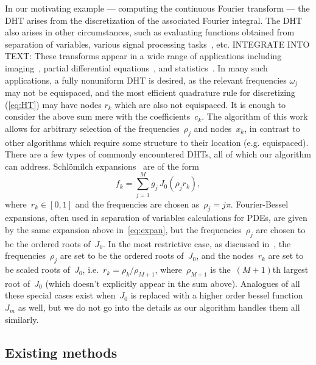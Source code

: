 In our motivating example --- computing the continuous Fourier transform --- the
DHT arises from the discretization of the associated Fourier integral. The DHT
also arises in other circumstances, such as evaluating functions obtained from
separation of variables, various signal processing tasks~\cite{},
etc.{\color{red} INTEGRATE INTO TEXT: These transforms appear in a wide range of
applications including imaging~\cite{higgins1988hankel, zhao2013fourier},
partial differential equations~\cite{bisseling1985fast,ali1999generalized}, and
statistics~\cite{lord1954a, genton2002nonparametric}. In many such applications,
a fully nonuniform DHT is desired, as the relevant frequencies $\omega_j$ may
not be equispaced, and the most efficient quadrature rule for discretizing
(\ref{eq:HT}) may have nodes $r_k$ which are also not equispaced. } It is enough
to consider the above sum mere with the coefficients~$c_k$. The algorithm of
this work allows for arbitrary selection of the frequencies~$\rho_j$ and
nodes~$x_k$, in contrast to other algorithms which require some structure to
their location (e.g. equispaced). There are a few types of commonly encountered
DHTs, all of which our algorithm can address. Schl\"omilch expansions~\cite{}
are of the form
\begin{equation}
  \label{eq:expan}
  f_k = \sum_{j = 1}^M g_j \, J_0(\rho_j r_k),
\end{equation}
where~$r_k \in [0,1]$ and the frequencies are chosen as~$\rho_j = j\pi$.
Fourier-Bessel expansions, often used in separation of variables calculations
for PDEs, are given by the same expansion above in~\eqref{eq:expan}, but the
frequencies~$\rho_j$ are chosen to be the ordered roots of~$J_0$. In the most
restrictive case, as discussed in~\cite{johnson1987}, the frequencies~$\rho_j$
are set to be the ordered roots of~$J_0$, and the nodes~$r_k$ are set to be
scaled roots of~$J_0$, i.e.~$r_k = \rho_k/\rho_{M+1}$, where~$\rho_{M+1}$ is
the~$(M+1)$th largest root of~$J_0$ (which doesn't explicitly appear in the sum
above). Analogues of all these special cases exist when~$J_0$ is replaced with a
higher order bessel function~$J_m$ as well, but we do not go into the details as
our algorithm handles them all similarly.

\subsection*{Existing methods}
\label{sec:existing}

